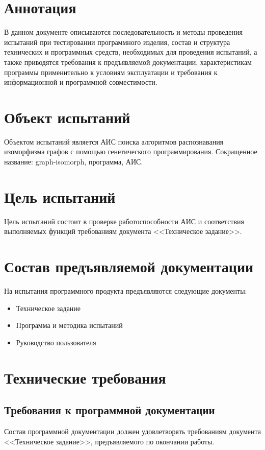 \documentclass[russian,utf8,emptystyle]{eskdtext}
\begin{document}
\maketitle

\section{Аннотация}
В данном документе описываются последовательность и методы проведения испытаний при тестировании программного изделия, состав и структура технических и программных средств, необходимых для проведения испытаний, а также приводятся требования к предъявляемой документации, характеристикам программы применительно к условиям эксплуатации и требования к информационной и программной совместимости.
\newpage

\tableofcontents
\newpage

\section{Объект испытаний}
Объектом испытаний является АИС поиска алгоритмов распознавания изоморфизма графов с помощью генетического программирования. Сокращенное название: graph-isomorph, программа, АИС.

\section{Цель испытаний}
Цель испытаний состоит в проверке работоспособности АИС и соответствия выполняемых функций требованиям документа <<Техническое задание>>.

\section{Состав предъявляемой документации}
На испытания программного продукта предъявляются следующие документы:
\begin{itemize}
\item Техническое задание
\item Программа и методика испытаний
\item Руководство пользователя
\end{itemize}

\section{Технические требования}
\subsection{Требования к программной документации}
Состав программной документации должен удовлетворять требованиям документа <<Техническое задание>>, предъявляемого по окончании работы.
\end{document}
